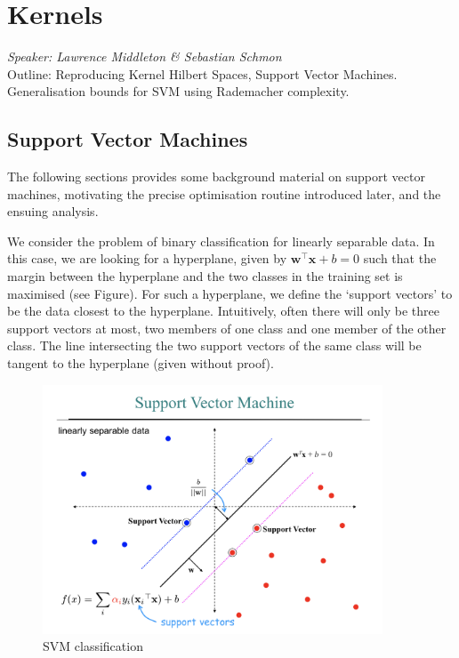 
\chapter{Kernels}
\emph{Speaker: Lawrence Middleton \& Sebastian Schmon}\\

Outline: Reproducing Kernel Hilbert Spaces, Support Vector Machines. Generalisation bounds for SVM using Rademacher complexity.

\section{Support Vector Machines}
The following sections provides some background material on support vector machines, motivating the precise optimisation routine introduced later, and the ensuing analysis.

We consider the problem of binary classification for linearly separable data. In this case, we are looking for a hyperplane, given by $\mathbf{w}^\top\mathbf{x}+b=0$ such that the margin between the hyperplane and the two classes in the training set is maximised (see Figure). For such a hyperplane, we define the `support vectors' to be the data closest to the hyperplane. Intuitively, often there will only be three support vectors at most, two members of one class and one member of the other class. The line intersecting the two support vectors of the same class will be tangent to the hyperplane (given without proof).
\begin{figure}
\center
\includegraphics[width=0.9\textwidth]{img/svm_pic.png}
\caption{SVM classification}
\end{figure}

